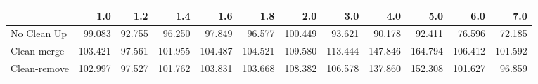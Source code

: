 \begin{tabular}{lrrrrrrrrrrr}
\toprule
{} &     1.0 &    1.2 &     1.4 &     1.6 &     1.8 &     2.0 &     3.0 &     4.0 &     5.0 &     6.0 &     7.0 \\
\midrule
No Clean Up  &  99.083 & 92.755 &  96.250 &  97.849 &  96.577 & 100.449 &  93.621 &  90.178 &  92.411 &  76.596 &  72.185 \\
Clean-merge  & 103.421 & 97.561 & 101.955 & 104.487 & 104.521 & 109.580 & 113.444 & 147.846 & 164.794 & 106.412 & 101.592 \\
Clean-remove & 102.997 & 97.527 & 101.762 & 103.831 & 103.668 & 108.382 & 106.578 & 137.860 & 152.308 & 101.627 &  96.859 \\
\bottomrule
\end{tabular}
